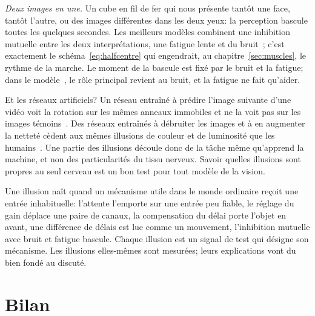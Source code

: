 \emph{Deux images en une.} Un cube en fil de fer qui nous présente tantôt une face, tantôt l'autre, ou des images différentes dans les deux yeux: la perception bascule toutes les quelques secondes. Les meilleurs modèles combinent une inhibition mutuelle entre les deux interprétations, une fatigue lente et du bruit~\cite{MorenoBote2007}; c'est exactement le schéma~\eqref{eq:halfcentre} qui engendrait, au chapitre~\ref{sec:muscles}, le rythme de la marche. Le moment de la bascule est fixé par le bruit et la fatigue; dans le modèle~\cite{MorenoBote2007}, le rôle principal revient au bruit, et la fatigue ne fait qu'aider.

Et les réseaux artificiels? Un réseau entraîné à prédire l'image suivante d'une vidéo voit la rotation sur les mêmes anneaux immobiles et ne la voit pas sur les images témoins~\cite{Watanabe2018}. Des réseaux entraînés à débruiter les images et à en augmenter la netteté cèdent aux mêmes illusions de couleur et de luminosité que les humains~\cite{GomezVilla2020}. Une partie des illusions découle donc de la tâche même qu'apprend la machine, et non des particularités du tissu nerveux. Savoir quelles illusions sont propres au seul cerveau est un bon test pour tout modèle de la vision.

\begin{keyblock}
\begin{proposition}
\label{prop:illusions}
Une illusion naît quand un mécanisme utile dans le monde ordinaire reçoit une entrée inhabituelle: l'attente l'emporte sur une entrée peu fiable, le réglage du gain déplace une paire de canaux, la compensation du délai porte l'objet en avant, une différence de délais est lue comme un mouvement, l'inhibition mutuelle avec bruit et fatigue bascule. Chaque illusion est un signal de test qui désigne son mécanisme. Les illusions elles-mêmes sont mesurées; leurs explications vont du bien fondé au discuté.
\end{proposition}
\end{keyblock}

\section{Bilan}

